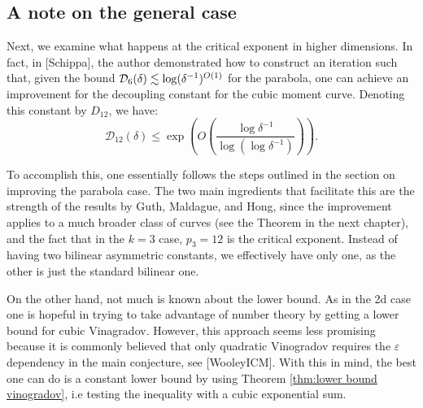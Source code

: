 \subsection{A note on the general case}
Next, we examine what happens at the critical exponent in higher dimensions. In fact, in [Schippa], the author demonstrated how to construct an iteration such that, given the bound $\mathcal{D}_6(\delta) \lesssim \log(\delta^{-1})^{O(1)}$ for the parabola, one can achieve an improvement for the decoupling constant for the cubic moment curve. Denoting this constant by $D_{12}$, we have:
\begin{equation*}
    \mathcal{D}_{12}(\delta) \leq \exp \left(O\left(\frac{\log \delta^{-1}}{\log \left(\log \delta^{-1}\right)}\right)\right).
\end{equation*}

To accomplish this, one essentially follows the steps outlined in the section on improving the parabola case. The two main ingredients that facilitate this are the strength of the results by Guth, Maldague, and Hong, since the improvement applies to a much broader class of curves (see the Theorem in the next chapter), and the fact that in the $k = 3$ case, $p_3 = 12$ is the critical exponent. Instead of having two bilinear asymmetric constants, we effectively have only one, as the other is just the standard bilinear one.


On the other hand, not much is known about the lower bound. As in the 2d case one is hopeful in trying to take advantage of number theory by getting a lower bound for cubic Vinagradov. However, this approach seems less promising because it is commonly believed that only quadratic Vinogradov requires the $\varepsilon$ dependency in the main conjecture, see [WooleyICM]. With this in mind, the best one can do is a constant lower bound by using Theorem \ref{thm:lower bound vinogradov}, i.e testing the inequality with a cubic exponential sum.